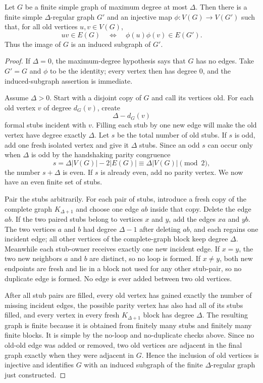 \begin{lemma}
Let $G$ be a finite simple graph of maximum degree at most $\Delta$.  Then
there is a finite simple $\Delta$-regular graph $G'$ and an injective map
$\phi:V(G)\to V(G')$ such that, for all old vertices $u,v\in V(G)$,
\[
uv\in E(G) \quad\Longleftrightarrow\quad
\phi(u)\phi(v)\in E(G').
\]
Thus the image of $G$ is an induced subgraph of $G'$.
\end{lemma}
\begin{proof}
If $\Delta=0$, the maximum-degree hypothesis says that $G$ has no edges.
Take $G'=G$ and $\phi$ to be the identity; every vertex then has degree
$0$, and the induced-subgraph assertion is immediate.

Assume $\Delta>0$.  Start with a disjoint copy of $G$ and call its vertices
old.  For each old vertex $v$ of degree $d_G(v)$, create
\[
\Delta-d_G(v)
\]
formal stubs incident with $v$.  Filling each stub by one new edge will make
the old vertex have degree exactly $\Delta$.  Let $s$ be the total number of
old stubs.  If $s$ is odd, add one fresh isolated vertex and give it
$\Delta$ stubs.  Since an odd $s$ can occur only when $\Delta$ is odd by the
handshaking parity congruence
\[
s=\Delta |V(G)|-2|E(G)|\equiv \Delta |V(G)|\pmod 2,
\]
the number $s+\Delta$ is even.  If $s$ is already even, add no parity
vertex.  We now have an even finite set of stubs.

Pair the stubs arbitrarily.  For each pair of stubs, introduce a fresh copy
of the complete graph $K_{\Delta+1}$ and choose one edge $ab$ inside that
copy.  Delete the edge $ab$.  If the two paired stubs belong to vertices
$x$ and $y$, add the edges $xa$ and $yb$.  The two vertices $a$ and $b$ had
degree $\Delta-1$ after deleting $ab$, and each regains one incident edge;
all other vertices of the complete-graph block keep degree $\Delta$.
Meanwhile each stub-owner receives exactly one new incident edge.  If
$x=y$, the two new neighbors $a$ and $b$ are distinct, so no loop is formed.
If $x\ne y$, both new endpoints are fresh and lie in a block not used for
any other stub-pair, so no duplicate edge is formed.  No edge is ever added
between two old vertices.

After all stub pairs are filled, every old vertex has gained exactly the
number of missing incident edges, the possible parity vertex has also had
all of its stubs filled, and every vertex in every fresh
$K_{\Delta+1}$ block has degree $\Delta$.  The resulting graph is finite
because it is obtained from finitely many stubs and finitely many finite
blocks.  It is simple by the no-loop and no-duplicate checks above.  Since
no old-old edge was added or removed, two old vertices are adjacent in the
final graph exactly when they were adjacent in $G$.  Hence the inclusion of
old vertices is injective and identifies $G$ with an induced subgraph of the
finite $\Delta$-regular graph just constructed.
\end{proof}
